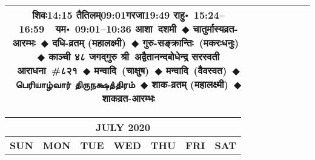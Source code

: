 \documentclass[a3paper,12pt,landscape]{article}
\newcommand{\eventsep}{~$\Diamondblack$ }
\newcommand{\To}{\hspace{1pt}\raisebox{0pt}{\tiny\RIGHTarrow}\hspace{1pt}}
\newcommand{\tamil}[1]{%
{\fontspec[Scale=0.9,FakeStretch=0.9]{Noto Sans Tamil} \footnotesize #1}}
\newcommand{\rahuyama}[2]{%
{राहु॰~\textsf{#1}~~यम॰~\textsf{#2}}
}
\begin{document}
\begin{center}
\begin{tabular}{|c|c|c|c|c|c|c|}
{{\mbox{शिवः\To{}\textsf{14:15\hspace{2ex}}}}%
{\mbox{तैतिलम्\To{}\textsf{09:01\hspace{2ex}}}\mbox{गरजा\To{}\textsf{19:49\hspace{2ex}}}}}%
{\rahuyama{15:24--16:59}{09:01--10:36}}%
{आशा~दशमी\eventsep चातुर्मास्यव्रत-आरम्भः\eventsep दधि-व्रतम् (महालक्ष्मी)\eventsep गुरु-सङ्क्रान्तिः~(मकरः\To{}धनुः)\eventsep काञ्ची ४८ जगद्गुरु श्री~अद्वैतानन्दबोधेन्द्र सरस्वती आराधना~\#{८२१}\eventsep मन्वादि~(चाक्षुष)\eventsep मन्वादि~(वैवस्वत)\eventsep \tamil{பெரியாழ்வார் திருநக்ஷத்திரம்}\eventsep शाक-व्रतम् (महालक्ष्मी)\eventsep शाकव्रत-आरम्भः}
&
\mbox{}  & %
\mbox{}  & %
\mbox{}  & %
\\ \hline
\end{tabular}



\begin{tabular}{|c|c|c|c|c|c|c|}
\multicolumn{7}{c}{\Large \bfseries \sffamily JULY 2020}\\[3mm]
\hline
\textbf{\textsf{SUN}} & \textbf{\textsf{MON}} & \textbf{\textsf{TUE}} & \textbf{\textsf{WED}} & \textbf{\textsf{THU}} & \textbf{\textsf{FRI}} & \textbf{\textsf{SAT}} \\ \hline


\end{tabular}
\end{center}
\end{document}
